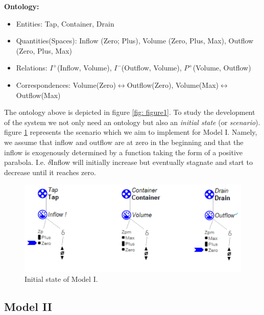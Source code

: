 \documentclass{article}
\begin{document}
\textbf{Ontology:}
\begin{itemize}
	\item Entities: Tap, Container, Drain
	\item Quantities(Spaces): Inflow (Zero; Plus), Volume (Zero, Plus, Max), Outflow (Zero, Plus, Max)
	\item Relations: $I^+$(Inflow, Volume), $I^-$(Outflow, Volume), $P^+$(Volume, Outflow)
	\item Correspondences: Volume(Zero)$\leftrightarrow$Outflow(Zero), Volume(Max)$\leftrightarrow$Outflow(Max)
\end{itemize}

The ontology above is depicted in figure \ref{fig: figure1}. To study the development of the system we not only need an ontology but also an \textit{initial state} (or \textit{scenario}). figure \ref{figure2} represents the scenario which we aim to implement for Model I. Namely, we assume that inflow and outflow are at zero in the beginning and that the inflow is exogenously determined by a function taking the form of a positive parabola. I.e. $\delta$Inflow will initially increase but eventually stagnate and start to decrease until it reaches zero.


\begin{figure}[!h]
	\centering
	\includegraphics{Scenario_1.png}
	\caption{Initial state of Model I.}
	\label{figure2}
\end{figure}

\subsection {Model II}
\end{document}
